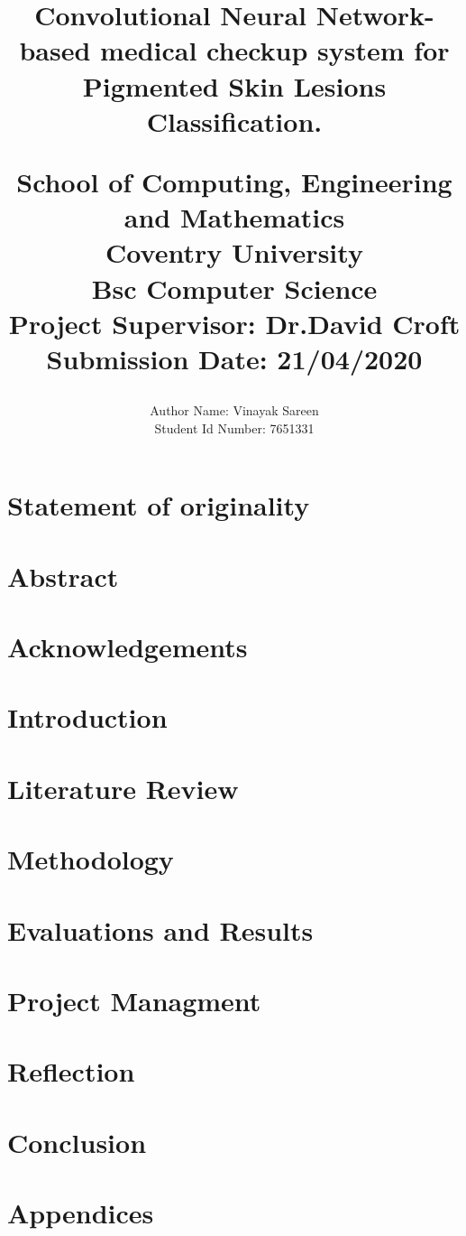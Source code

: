 \documentclass[14pts]{report}
\title{
	\begin{center}
	{Convolutional Neural Network-based medical checkup system for Pigmented Skin Lesions Classification.} \\
	\vspace{5mm} %
	
	\large {
		{School of Computing, Engineering and Mathematics}\\
		{Coventry University}\\
	}
	\vspace{3mm} %
	\textbf{ Bsc Computer Science}\\
	{\large Project Supervisor: Dr.David Croft}\\
	{\large Submission Date: 21/04/2020} \\
	\end{center}
}
\author{
	{\large Author Name:  Vinayak Sareen} \\
	{\large Student Id Number:  7651331}
}
\date{}
\begin{document}
\maketitle

\chapter*{Statement of originality}


\chapter*{Abstract}


\tableofcontents

\chapter*{Acknowledgements}


\chapter{Introduction}


\chapter{Literature Review}


\chapter{Methodology}


\chapter{Evaluations and Results}


\chapter{Project Managment}


\chapter{Reflection}


\chapter{Conclusion}





\chapter*{Appendices}

\end{document}
